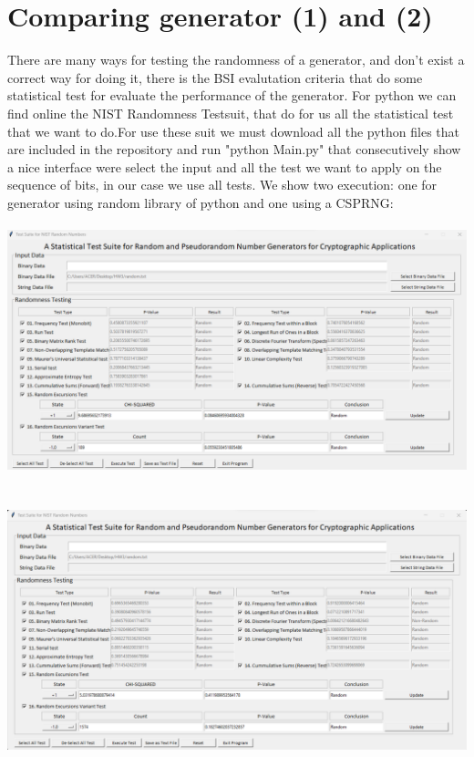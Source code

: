 \documentclass{article}
\begin{document}
\section{Comparing generator (1) and (2)}
There are many ways for testing the randomness of a generator, and don't exist a correct way for doing it, there is the BSI evalutation criteria that do some statistical test for evaluate the performance of the generator. For python we can find online the NIST Randomness Testsuit, that do for us all the statistical test that we want to do.For use these suit we must download all the python files that are included in the repository and run "python Main.py" that consecutively show a nice interface were select the input and all the test we want to apply on the sequence of bits, in our case we use all tests. We show two execution: one for generator using random library of python and one using a CSPRNG:\\
\\
\includegraphics[scale=0.4]{hw03-1884749}
\\\\\\
\includegraphics[scale=0.4]{hw03-1884749-1}
\\
\end{document}
